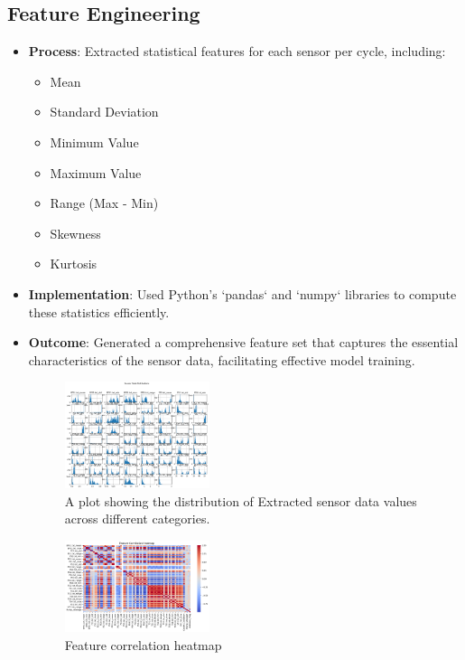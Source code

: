 \documentclass[sigconf]{acmart}
\begin{document}
\subsection{Feature Engineering} 
\begin{itemize} 
    \item \textbf{Process}: Extracted statistical features for each sensor per cycle, including:
    \begin{itemize} 
        \item Mean
        \item Standard Deviation
        \item Minimum Value
        \item Maximum Value
        \item Range (Max - Min)
        \item Skewness
        \item Kurtosis
    \end{itemize}
    \item \textbf{Implementation}: Used Python's `pandas` and `numpy` libraries to compute these statistics efficiently.
    \item \textbf{Outcome}: Generated a comprehensive feature set that captures the essential characteristics of the sensor data, facilitating effective model training.
    \begin{figure}[htbp]  %
        \centering
        \includegraphics[width=0.4\textwidth]{sensor_data_distributions.png}  %
        \caption{A plot showing the distribution of Extracted sensor data values across different categories.}
        \label{fig:example}
    \end{figure}
    \begin{figure}[htbp]  %
        \centering
        \includegraphics[width=0.4\textwidth]{feature_correlation_heatmap.png}  %
        \caption{Feature correlation heatmap}
        \label{fig:example}
    \end{figure}
\end{itemize}
\end{document}

